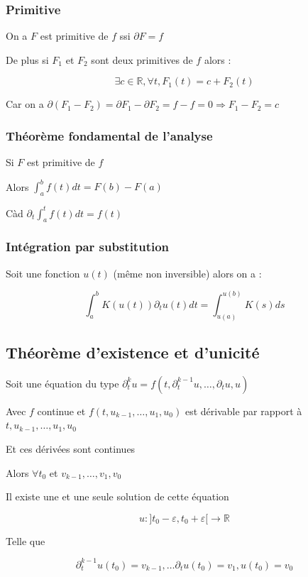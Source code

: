 \documentclass[a4paper,10pt]{article}
\newcommand{\ap}{\rightarrow}
\newcommand{\R}{\mathbb{R}}
\newcommand{\so}{\Rightarrow}
\begin{document}



\subsubsection{Primitive}

On a $F$ est primitive de $f$ ssi $\partial F = f$

De plus si $F_1$ et $F_2$ sont deux primitives de $f$ alors :

$$\exists c \in \R, \forall t, F_1 (t) = c + F_2(t)$$

Car on a $\partial(F_1 - F_2) = \partial F_1 - \partial F_2 = f - f = 0 \so F_1 - F_2 = c$

\subsubsection{Théorème fondamental de l'analyse}

Si $F$ est primitive de $f$ 

Alors $\int_a^b f(t) dt= F(b) - F(a)$

Càd $\partial_t \int_a^t f(t) dt = f(t)$

\subsubsection{Intégration par substitution}

Soit une fonction $u(t)$ (même non inversible) alors on a :

$$\int_a^b K(u(t)) \partial_t u(t) dt = \int_{u(a)}^{u(b)} K(s) ds$$

\subsection{Théorème d'existence et d'unicité}

Soit une équation du type $\partial_t^k u = f(t, \partial_t^{k-1} u, \dots,\partial_t u, u)$

Avec $f$ continue et $f(t,u_{k-1},\dots,u_1,u_0)$ est dérivable par rapport à $t,u_{k-1},\dots,u_1,u_0$

Et ces dérivées sont continues

Alors $\forall t_0$ et $v_{k-1},\dots,v_1,v_0$

Il existe une et une seule solution de cette équation

$$u:]t_0 - \varepsilon,t_0 + \varepsilon[ \ap \R$$

Telle que 

$$\partial^{k-1}_t u(t_0) = v_{k-1}, \dots \partial_t u(t_0) = v_1, u(t_0) = v_0$$
\end{document}
